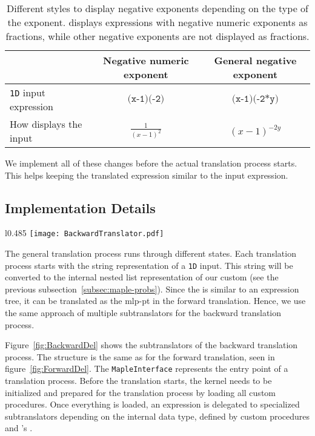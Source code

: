 \begin{table}[ht]
\centering
\begin{tabular}{p{2.6cm}cc}
	\hline
	& Negative numeric exponent & General negative exponent\\
	\hline
	\texttt{1D} \Maple{} input expression & $\texttt{(x-1)\^{}(-2)}$ & \rule{0pt}{0.9\normalbaselineskip}$\texttt{(x-1)\^{}(-2*y)}$\\
	How \Maple{} displays the input & $\displaystyle\frac{1}{(x-1)^2}$ & $\displaystyle(x-1)^{-2y}$\\
	\hline
\end{tabular}
\caption{Different styles to display negative exponents depending on the type of the exponent. \Maple{} displays expressions with negative numeric exponents as fractions, while other negative exponents are not displayed as fractions.}
\label{tab:maple-fracs}
\end{table}

We implement all of these changes before the actual translation process starts. This helps keeping the translated expression similar to the input expression.

\subsection{Implementation Details}\label{subsec:maple-impl}
\begin{wrapfigure}{l}{0.485\textwidth}
	\vspace{-12pt}
	\centering
	\texttt{[image: BackwardTranslator.pdf]}
	\caption{A scheme of the backward translator and its specialized subtranslators.}
	\label{fig:BackwardDel}
	\vspace{-13pt}
\end{wrapfigure}

The general translation process runs through different states. Each translation process starts with the string representation of a \texttt{1D} \Maple{} input. This string will be converted to the internal nested list representation of our custom \inertF{} (see the previous subsection~\ref{subsec:maple-probs}). Since the \inertF{} is similar to an expression tree, it can be translated as the \gls{mlp-pt} in the forward translation. Hence, we use the same approach of multiple subtranslators for the backward translation process.

Figure~\ref{fig:BackwardDel} shows the subtranslators of the backward translation process. The structure is the same as for the forward translation, seen in figure~\ref{fig:ForwardDel}. The \verb|MapleInterface| represents the entry point of a translation process. Before the translation starts, the \Maple{} kernel needs to be initialized and prepared for the translation process by loading all custom procedures. Once everything is loaded, an expression is delegated to specialized subtranslators depending on the internal data type, defined by custom procedures and \Maple's \inertF.

